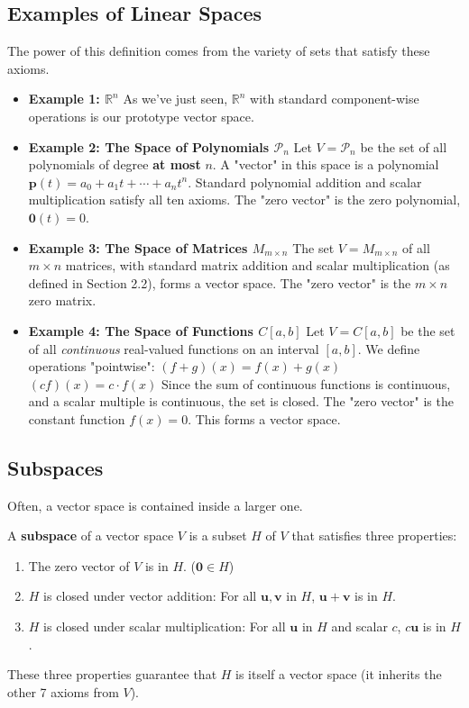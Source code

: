 \subsection{Examples of Linear Spaces}
The power of this definition comes from the variety of sets that satisfy these axioms.
\begin{itemize}
    \item \textbf{Example 1: $\mathbb{R}^n$}
    As we've just seen, $\mathbb{R}^n$ with standard component-wise operations is our prototype vector space.
    
    \item \textbf{Example 2: The Space of Polynomials $\mathcal{P}_n$}
    Let $V = \mathcal{P}_n$ be the set of all polynomials of degree \textbf{at most} $n$. A "vector" in this space is a polynomial $\mathbf{p}(t) = a_0 + a_1t + \cdots + a_nt^n$.
    Standard polynomial addition and scalar multiplication satisfy all ten axioms. The "zero vector" is the zero polynomial, $\mathbf{0}(t) = 0$.
    
    \item \textbf{Example 3: The Space of Matrices $M_{m \times n}$}
    The set $V = M_{m \times n}$ of all $m \times n$ matrices, with standard matrix addition and scalar multiplication (as defined in Section 2.2), forms a vector space. The "zero vector" is the $m \times n$ zero matrix.
    
    \item \textbf{Example 4: The Space of Functions $C[a, b]$}
    Let $V = C[a, b]$ be the set of all \emph{continuous} real-valued functions on an interval $[a, b]$.
    We define operations "pointwise":
    $(f+g)(x) = f(x) + g(x)$
    $(cf)(x) = c \cdot f(x)$
    Since the sum of continuous functions is continuous, and a scalar multiple is continuous, the set is closed. The "zero vector" is the constant function $f(x) = 0$. This forms a vector space.
\end{itemize}

\subsection{Subspaces}
Often, a vector space is contained inside a larger one.

\begin{definition}
A \textbf{subspace} of a vector space $V$ is a subset $H$ of $V$ that satisfies three properties:
\begin{enumerate}
    \item The zero vector of $V$ is in $H$. ($\mathbf{0} \in H$)
    \item $H$ is closed under vector addition: For all $\mathbf{u}, \mathbf{v}$ in $H$, $\mathbf{u} + \mathbf{v}$ is in $H$.
    \item $H$ is closed under scalar multiplication: For all $\mathbf{u}$ in $H$ and scalar $c$, $c\mathbf{u}$ is in $H$.
\end{enumerate}
These three properties guarantee that $H$ is itself a vector space (it inherits the other 7 axioms from $V$).
\end{definition}


